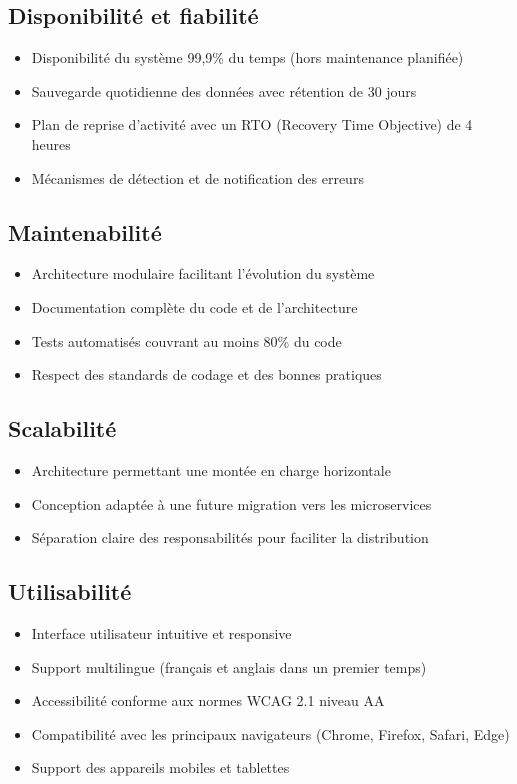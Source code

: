 \documentclass[12pt,a4paper]{report}
\begin{document}
\subsection{Disponibilité et fiabilité}

\begin{itemize}
\item Disponibilité du système 99,9\% du temps (hors maintenance planifiée)
\item Sauvegarde quotidienne des données avec rétention de 30 jours
\item Plan de reprise d'activité avec un RTO (Recovery Time Objective) de 4 heures
\item Mécanismes de détection et de notification des erreurs
\end{itemize}

\subsection{Maintenabilité}

\begin{itemize}
\item Architecture modulaire facilitant l'évolution du système
\item Documentation complète du code et de l'architecture
\item Tests automatisés couvrant au moins 80\% du code
\item Respect des standards de codage et des bonnes pratiques
\end{itemize}

\subsection{Scalabilité}

\begin{itemize}
\item Architecture permettant une montée en charge horizontale
\item Conception adaptée à une future migration vers les microservices
\item Séparation claire des responsabilités pour faciliter la distribution
\end{itemize}

\subsection{Utilisabilité}

\begin{itemize}
\item Interface utilisateur intuitive et responsive
\item Support multilingue (français et anglais dans un premier temps)
\item Accessibilité conforme aux normes WCAG 2.1 niveau AA
\item Compatibilité avec les principaux navigateurs (Chrome, Firefox, Safari, Edge)
\item Support des appareils mobiles et tablettes
\end{itemize}
\end{document}
